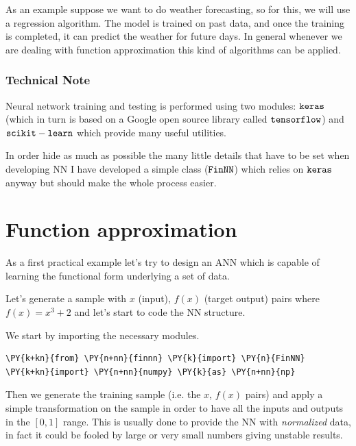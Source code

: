 As an example suppose we want to do weather forecasting, so for this, we will
use a regression algorithm. The model is trained
on past data, and once the training is completed, it can predict the
weather for future days. In general whenever we are dealing with
function approximation this kind of algorithms can be applied.

\subsubsection{Technical Note}\label{technical-note}

Neural network training and testing is performed using two modules:
\(\tt{keras}\) (which in turn is based on a Google open source library
called \(\tt{tensorflow}\)) and \(\tt{scikit-learn}\) which provide many
useful utilities.

In order hide as much as possible the many little details that have to
be set when developing NN I have developed a simple class
(\(\tt{FinNN}\)) which relies on \(\tt{keras}\) anyway but should make
the whole process easier.

\section{Function approximation}\label{function-approximation}

As a first practical example let's try to design an ANN which is capable
of learning the functional form underlying a set of data.

Let's generate a sample with \(x\) (input), \(f(x)\) (target output)
pairs where \(f(x) = x^3 +2\) and let's start to code the NN structure.

We start by importing the necessary modules.

\begin{tcolorbox}[breakable, size=fbox, boxrule=1pt, pad at break*=1mm,colback=cellbackground, colframe=cellborder]
\begin{Verbatim}[commandchars=\\\{\}]
\PY{k+kn}{from} \PY{n+nn}{finnn} \PY{k}{import} \PY{n}{FinNN}
\PY{k+kn}{import} \PY{n+nn}{numpy} \PY{k}{as} \PY{n+nn}{np}
\end{Verbatim}
\end{tcolorbox}

Then we generate the training sample (i.e. the \(x\), \(f(x)\) pairs)
and apply a simple transformation on the sample in order to have all the
inputs and outputs in the \([0, 1]\) range. This is usually done to
provide the NN with \emph{normalized} data, in fact it could be fooled
by large or very small numbers giving unstable results.


